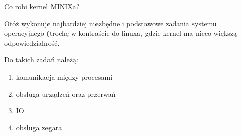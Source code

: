 Co robi kernel MINIXa?

Otóż wykonuje najbardziej niezbędne i podstawowe zadania systemu operacyjnego (trochę w kontraście do linuxa, gdzie kernel ma nieco większą odpowiedzialność.

Do takich zadań należą:
\begin{enumerate}
	\item komunikacja między procesami
	\item obsługa urządzeń oraz przerwań
	\item IO
	\item obsługa zegara
\end{enumerate}